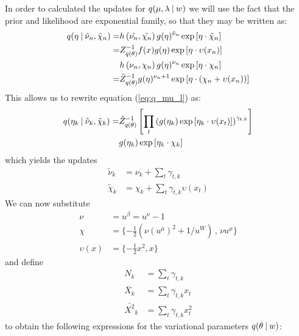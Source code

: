 In order to calculated the updates for $q(\mu,\lambda \:|\: w)$ we will use the fact that the prior and likelihood are exponential family, so that they may be written as:
\begin{align}
  \begin{split}
    q(\eta \:|\: \tilde{\nu}_{n}, \tilde{\chi}_{n})
    = &
    h \left(\tilde{\nu_{n}}, \tilde{\chi_{n}} \right) 
    g(\eta)^{\tilde{\nu}_{n}} 
    \exp \left[ \eta \cdot \tilde{\chi}_{n} \right] \\
    = &
    Z_{q(\theta)}^{-1}
    f(x) g(\eta)
    \exp \left[ \eta \cdot \upsilon(x_{n}) \right] \\
    & h \left(\nu_{n}, \chi_{n} \right) 
    g(\eta)^{\nu_{n}} 
    \exp \left[ \eta \cdot \chi_{n}  \right] \\
    = &
    \tilde{Z}_{q(\theta)}^{-1}
    g(\eta)^{\nu_{n} + 1} 
    \exp \left[ \eta \cdot (\chi_{n} + \upsilon(x_{n})) \right] 
  \end{split}
\end{align}
This allows us to rewrite equation (\ref{eq:q_mu_l}) as:
\begin{align}
  q(\eta_{k} \:|\: \tilde{\nu}_{k}, \tilde{\chi}_{k})
  =& \tilde{Z}_{q(\theta)}^{-1} 
      \left[
        \prod_t
        \left(
          g(\eta_{k}) \exp \left[ \eta_{k} \cdot \upsilon(x_{t}) \right]
        \right)^{\gamma_{t,k}}
      \right] \\
     & g(\eta_{k}) \exp \left[ \eta_{k} \cdot \chi_{k} \right]
\end{align}
which yields the updates
\begin{align}
  \tilde{\nu}_{k} &= \nu_{k} + \sum_t \gamma_{t,k} \\
  \tilde{\chi}_{k} &= \chi_{k} + \sum_t \gamma_{t,k} \upsilon(x_{t})
\end{align}
 We can now substitute 
\begin{align}
  \nu &= u^\beta = u^\nu - 1 \\
  \chi &= \{ -\tfrac{1}{2}(\nu (u^\mu)^2 + 1/u^W) \,,\, \nu u^\mu \} \\
  \upsilon(x) &= \{-\tfrac{1}{2} x^2, x\} 
\end{align}
and define
\begin{align}
  N_{k} &= \sum_t \gamma_{t,k} \\
  \bar{X}_{k} &= \sum_t \gamma_{t,k} x_{t} \\
  \bar{X^2}_{k} &= \sum_t \gamma_{t,k} x_{t}^2 
\end{align}
to obtain the following expressions for the variational parameters $q(\theta \:|\: w)$:
